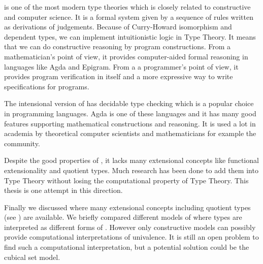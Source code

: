 \mltt is one of the most modern type theories which is closely related to constructive \maths and computer science. It is a formal system given by a sequence of rules written as derivations of judgements. Because of Curry-Howard isomorphism and dependent types, we can implement intuitionistic logic in Type Theory. It means that we can do constructive reasoning by program constructions. From a mathematician's point of view, it provides computer-aided formal reasoning in languages like Agda and Epigram. From a a programmer's point of view, it provides program verification in itself and a more expressive way to write specifications for programs.

The intensional version of \mltt has decidable type checking which is a popular choice in programming languages. Agda is one of these languages and it has many good features supporting mathematical constructions and reasoning. It is used a lot in academia by theoretical computer scientists and mathematicians for example the \hott community. 

Despite the good properties of \itt, it lacks many extensional concepts like functional extensionality and quotient types. Much research has been done to add them into Type Theory without losing the computational property of Type Theory. This thesis is one attempt in this direction.

Finally we discussed \hott where many extensional concepts including quotient types (see ) are available. 
We briefly compared different models of \hott where types are interpreted as different forms of \wog. However only constructive models can possibly provide computational interpretations of univalence. It is still an open problem to find such a computational interpretation, but a potential solution could be the cubical set model.







